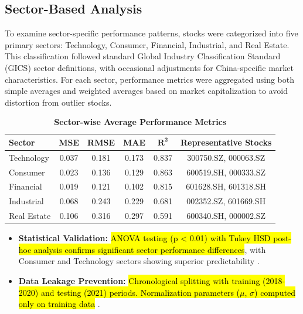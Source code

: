 \documentclass[3p,times,procedia]{elsarticle}
\begin{document}
\subsection{Sector-Based Analysis}
\vspace{-2pt}
To examine sector-specific performance patterns, stocks were categorized into five primary sectors: Technology, Consumer, Financial, Industrial, and Real Estate. This classification followed standard Global Industry Classification Standard (GICS) sector definitions, with occasional adjustments for China-specific market characteristics. For each sector, performance metrics were aggregated using both simple averages and weighted averages based on market capitalization to avoid distortion from outlier stocks.

\begin{table}[!ht]\footnotesize
\centering
\caption{\textbf{Sector-wise Average Performance Metrics}}
\begin{tabular}{|l|c|c|c|c|c|}
\hline
\textbf{Sector} & \textbf{MSE} & \textbf{RMSE} & \textbf{MAE} & \textbf{$\mathbf{R^2}$} & \textbf{Representative Stocks} \\
\hline
Technology & 0.037 & 0.181 & 0.173 & 0.837 & 300750.SZ, 000063.SZ \\
Consumer & 0.023 & 0.136 & 0.129 & 0.863 & 600519.SH, 000333.SZ \\
Financial & 0.019 & 0.121 & 0.102 & 0.815 & 601628.SH, 601318.SH \\
Industrial & 0.068 & 0.243 & 0.229 & 0.681 & 002352.SZ, 601669.SH \\
Real Estate & 0.106 & 0.316 & 0.297 & 0.591 & 600340.SH, 000002.SZ \\
\hline
\end{tabular}
\end{table}

\begin{itemize}\setlength{\itemsep}{1pt}
\item \textbf{Statistical Validation:} \hl{ANOVA testing (p < 0.01) with Tukey HSD post-hoc analysis confirms significant sector performance differences}, with Consumer and Technology sectors showing superior predictability \cite{Box1970,Tukey1949}.

\item \textbf{Data Leakage Prevention:} \hl{Chronological splitting with training (2018-2020) and testing (2021) periods. Normalization parameters ($\mu$, $\sigma$) computed only on training data} \cite{Fischer2018}.
\end{itemize}
\end{document}

